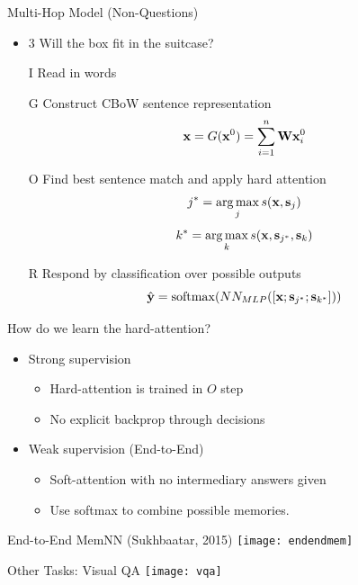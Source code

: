 \documentclass{beamer}
\begin{document}
\begin{frame}{Multi-Hop Model (Non-Questions)}
  \begin{itemize}
  \item 3 Will the box fit in the suitcase?
  \end{itemize}

  \begin{itemize}
  \item[I] Read in words
  \item[G] Construct CBoW sentence representation 
    \[\mathbf{x} = G(\mathbf{x}^0) =  \sum_{i=1}^n \mathbf{W} \mathbf{x}^0_i\]
  \item[O] Find best sentence match and apply hard attention
    \[j^* = \argmax_j s(\boldx, \bolds_j) \] 
    \[k^* = \argmax_k s(\boldx, \bolds_{j^*}, \bolds_k) \] 
  \item[R] Respond by classification over possible outputs
    \[\hat{\boldy} =\softmax(NN_{MLP}([\boldx; \bolds_{j^*}; \bolds_{k^*}])) \]
  \end{itemize}
\end{frame}


\begin{frame}
  How do we learn the hard-attention? 

  \begin{itemize}
  \item Strong supervision
    \begin{itemize}
    \item Hard-attention is trained in $O$ step
    \item No explicit backprop through decisions
    \end{itemize}
    \air 

  \item Weak supervision (End-to-End) 
    \begin{itemize}
    \item Soft-attention with no intermediary answers given
    \item Use softmax to combine possible memories.
    \end{itemize}
  \end{itemize}
\end{frame}


\begin{frame}{End-to-End MemNN (Sukhbaatar, 2015)}
  \texttt{[image: endendmem]}
\end{frame}

\begin{frame}{Other Tasks: Visual QA}
  \texttt{[image: vqa]}
\end{frame}
\end{document}
